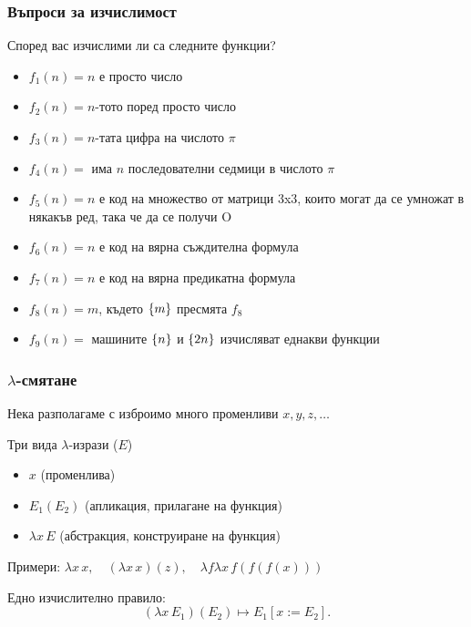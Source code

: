\documentclass{beamer}
\begin{document}
\begin{frame}
  \frametitle{Въпроси за изчислимост}

  Според вас изчислими ли са следните функции?
  \begin{itemize}[<+->]
  \item $f_1(n) = n$ е просто число
  \item $f_2(n) = n$-тото поред просто число
  \item $f_3(n) = n$-тата цифра на числото $\pi$
  \item $f_4(n) = $ има $n$ последователни седмици в числото $\pi$
  \item $f_5(n) = n$ е код на множество от матрици 3x3, които могат да се умножат в някакъв ред, така че да се получи O
  \item $f_6(n) = n$ е код на вярна съждителна формула
  \item $f_7(n) = n$ е код на вярна предикатна формула
  \item $f_8(n) = m$, където $\{m\}$ пресмята $f_8$
  \item $f_9(n) = $ машините $\{n\}$ и $\{2n\}$ изчисляват еднакви функции
  \end{itemize}
\end{frame}

\begin{frame}
  \frametitle{$\lambda$-смятане}

  Нека разполагаме с изброимо много променливи $x,y,z,\ldots$
  \vspace{1em}

  Три вида $\lambda$-изрази ($E$)
  \begin{itemize}
  \item $x$ (променлива)
  \item $E_1(E_2)$ (апликация, прилагане на функция)
  \item $\lambda x \, E$ (абстракция, конструиране на функция)
  \end{itemize}
  \vspace{1em}

  \pause

  Примери: $\lambda x\, x, \quad (\lambda x\, x)(z), \quad \lambda f\lambda x\, f(f(f(x)))$
  \vspace{1em}

  \pause

  Едно изчислително правило:
  \begin{equation*}
    (\lambda x\,E_1)(E_2) \mapsto E_1[x := E_2].
  \end{equation*}
\end{frame}
\end{document}
